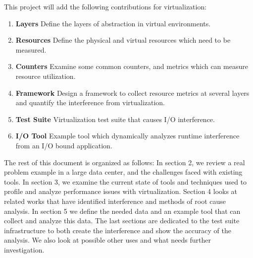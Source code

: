 \indent This project will add the following contributions for virtualization:
\begin{enumerate}
\item \textbf{Layers} Define the layers of abstraction in virtual environments.
\item \textbf{Resources} Define the physical and virtual resources which need to be measured.
\item \textbf{Counters} Examine some common counters, and metrics which can measure resource utilization.
\item \textbf{Framework} Design a framework to collect resource metrics at several layers and quantify the interference from virtualization.
\item \textbf{Test Suite} Virtualization test suite that causes I/O interference.
\item \textbf{I/O Tool} Example tool which dynamically analyzes runtime interference from an I/O bound application.
\end{enumerate}

\indent The rest of this document is organized as follows:  In section 2, we review a real problem example in a large data center, and the challenges faced with existing tools.  In section 3, we examine the current state of tools and techniques used to profile and analyze performance issues with virtualization.  Section 4 looks at related works that have identified interference and methods of root cause analysis.  In section 5 we define the needed data and an example tool that can collect and analyze this data.  The last sections are dedicated to the test suite infrastructure to both create the interference and show the accuracy of the analysis.  We also look at possible other uses and what needs further investigation.
